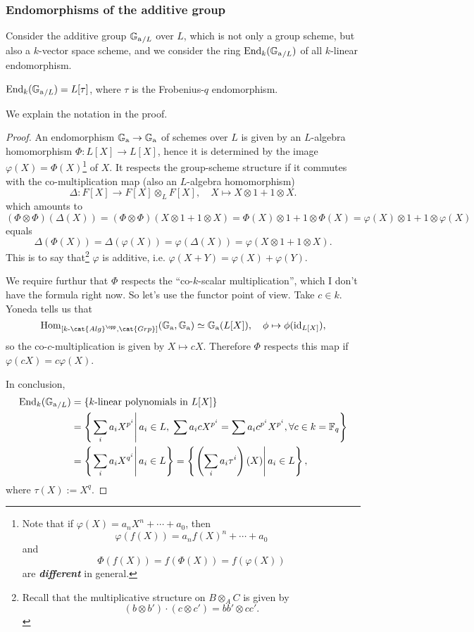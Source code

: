 \documentclass{article}
\newcommand{\F}{\mathbb{F}}
\begin{document}
\subsubsection{Endomorphisms of the additive group}
Consider the additive group ${\mathbb{G}_{\mathrm{a}}}_{/L}$ over $L$,
which is not only a group scheme, but also a $k$-vector space scheme,
and we consider the ring $\operatorname{End}_{k}({\mathbb{G}_{\mathrm{a}}}_{/L})$ of all $k$-linear endomorphism.
\begin{proposition}
    $\operatorname{End}_{k}({\mathbb{G}_{\mathrm{a}}}_{/L}) = L[\tau]$, where $\tau$ is the Frobenius-$q$ endomorphism.
\end{proposition}
We explain the notation in the proof.
\begin{proof}
    An endomorphism ${\mathbb{G}_{\mathrm{a}}}\to{\mathbb{G}_{\mathrm{a}}}$ of schemes over $L$ is given by an $L$-algebra homomorphism $\Phi: L[X]\to L[X]$,
    hence it is determined by the image $\varphi(X) = \Phi(X)$\footnote{
        Note that if $\varphi(X) = a_nX^n + \cdots + a_0$,
        then \[\varphi(f(X)) = a_nf(X)^n  + \cdots + a_0\] and
        \[\Phi(f(X)) = f(\Phi(X)) = f(\varphi(X))\] are \textit{\textbf{different}} in general.
    } of $X$.
    It respects the group-scheme structure if it commutes with the co-multiplication map (also an $L$-algebra homomorphism) \[\Delta : F[X]\to F[X]\otimes_L F[X],\quad X\mapsto X\otimes 1 + 1\otimes X.\]
    which amounts to\[(\Phi\otimes\Phi)(\Delta(X)) = (\Phi\otimes\Phi)(X\otimes 1 + 1\otimes X) =  \Phi(X)\otimes 1 + 1\otimes\Phi(X) = 
    \varphi(X)\otimes 1 + 1\otimes\varphi(X)\]
    equals \[\Delta(\Phi(X)) = \Delta(\varphi(X)) = \varphi(\Delta(X)) = \varphi(X\otimes 1 + 1\otimes X).\]
    This is to say that\footnote{
        Recall that the multiplicative structure on $B\otimes_A C$ is given by \[(b\otimes b')\cdot(c\otimes c') = bb'\otimes cc'.\]
    } $\varphi$ is additive, i.e. $\varphi(X+Y) = \varphi(X) + \varphi(Y)$.

    We require furthur that $\Phi$ respects the ``co-$k$-scalar multiplication'', which I don't have the formula right now.
    So let's use the functor point of view.
    Take $c\in k$.
    Yoneda tells us that
    \[\Hom_{[k\text{-}\cat{Alg}^\opp, \cat{Grp}]}(\Ga, \Ga) \simeq \Ga(L[X]), \quad \phi\mapsto \phi(\Id_{L[X]}),\]
    so the co-$c$-multiplication is given by $X\mapsto cX$.
    Therefore $\Phi$ respects this map if $\varphi(cX) = c\varphi(X)$.

    In conclusion,
    \begin{align*}
        \enom_{k}(\Ga_{/L}) &= \{k\text{-linear polynomials in } L[X] \}\\
        &= \left\{\left.\sum_{i}a_i X^{p^i}\right|a_i\in L,\;\sum a_icX^{p^i} = \sum a_ic^{p^i}X^{p^i},\forall c\in k = \F_q\right\}\\
        &= \left\{ \left.\sum_{i}a_i X^{q^i}\right| a_i\in L \right\}
        = \left\{ \left.\left( \sum_{i}a_i \tau^{i} \right)(X)\right| a_i\in L \right\},
    \end{align*}
    where $\tau(X) := X^q$.


\end{proof}
\end{document}
